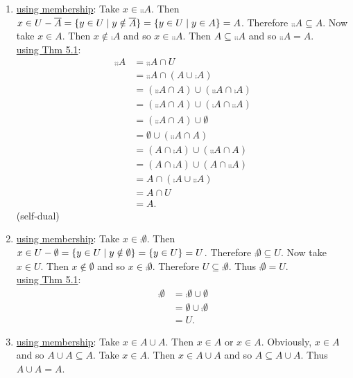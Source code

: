 \documentclass[11pt]{book}
\begin{document}
\begin{enumerate}
{\begin{enumerate}
\item %
\underline{using membership}: Take $x \in \comp{\comp{A}}$. Then $x \in U - \overline{A} = \{y \in U \mid y \notin \overline{A}\} = \{y \in U \mid y \in A\} = A$. Therefore $\comp{\comp{A}} \subseteq A$. Now take $x \in A$. Then $x \notin \comp{A}$ and so $x \in \comp{\comp{A}}$. Then $A \subseteq \comp{\comp{A}}$ and so $\comp{\comp{A}} = A$.\\
\underline{using Thm 5.1}: \begin{align*}\comp{\comp{A}} &= \comp{\comp{A}} \cap U \tag{5.1.4'}\\&= \comp{\comp{A}} \cap (A \cup \comp{A}) \tag{5.1.5}\\&= (\comp{\comp{A}} \cap A) \cup (\comp{\comp{A}} \cap \comp{A}) \tag{5.1.3'}\\&= (\comp{\comp{A}} \cap A) \cup (\comp{A} \cap \comp{\comp{A}}) \tag{5.1.2'}\\&= (\comp{\comp{A}} \cap A) \cup \emptyset \tag{5.1.5'}\\&= \emptyset \cup (\comp{\comp{A}} \cap A)\tag{5.1.2}\\&= (A \cap \comp{A}) \cup (\comp{\comp{A}} \cap A)\tag{5.1.5'}\\&= (A \cap \comp{A}) \cup (A \cap \comp{\comp{A}})\tag{5.1.2'}\\&= A \cap (\comp{A} \cup \comp{\comp{A}})\tag{5.1.3'}\\&= A \cap U\tag{5.1.5}\\&= A.\tag{5.1.4'}\end{align*} (self-dual)
\item %
\underline{using membership}: Take $x \in \comp{\emptyset}$. Then $x \in U - \emptyset = \{y \in U \mid y \notin \emptyset\} = \{y \in U\} = U$. Therefore $\comp{\emptyset} \subseteq U$. Now take $x \in U$. Then $x \notin \emptyset$ and so $x \in \comp{\emptyset}$. Therefore $U \subseteq \comp{\emptyset}$. Thus $\comp{\emptyset} = U$.\\
\underline{using Thm 5.1}: \begin{align*}\comp{\emptyset} &= \comp{\emptyset} \cup \emptyset \tag{5.1.4}\\&= \emptyset \cup \comp{\emptyset} \tag{5.1.2}\\&= U.\tag{5.1.5}\end{align*}
\item %
\underline{using membership}: Take $x \in A \cup A$. Then $x \in A$ or $x \in A$. Obviously, $x \in A$ and so $A \cup A \subseteq A$. Take $x \in A$. Then $x \in A \cup A$ and so $A \subseteq A \cup A$. Thus $A \cup A = A$.\\

\end{enumerate}}
\end{enumerate}
\end{document}
